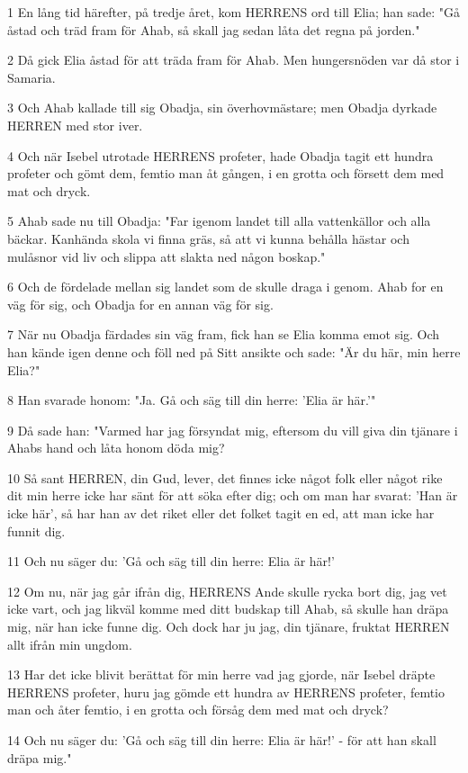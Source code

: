 \par 1 En lång tid härefter, på tredje året, kom HERRENS ord till Elia; han sade: "Gå åstad och träd fram för Ahab, så skall jag sedan låta det regna på jorden."
\par 2 Då gick Elia åstad för att träda fram för Ahab. Men hungersnöden var då stor i Samaria.
\par 3 Och Ahab kallade till sig Obadja, sin överhovmästare; men Obadja dyrkade HERREN med stor iver.
\par 4 Och när Isebel utrotade HERRENS profeter, hade Obadja tagit ett hundra profeter och gömt dem, femtio man åt gången, i en grotta och försett dem med mat och dryck.
\par 5 Ahab sade nu till Obadja: "Far igenom landet till alla vattenkällor och alla bäckar. Kanhända skola vi finna gräs, så att vi kunna behålla hästar och mulåsnor vid liv och slippa att slakta ned någon boskap."
\par 6 Och de fördelade mellan sig landet som de skulle draga i genom. Ahab for en väg för sig, och Obadja for en annan väg för sig.
\par 7 När nu Obadja färdades sin väg fram, fick han se Elia komma emot sig. Och han kände igen denne och föll ned på Sitt ansikte och sade: "Är du här, min herre Elia?"
\par 8 Han svarade honom: "Ja. Gå och säg till din herre: 'Elia är här.'"
\par 9 Då sade han: "Varmed har jag försyndat mig, eftersom du vill giva din tjänare i Ahabs hand och låta honom döda mig?
\par 10 Så sant HERREN, din Gud, lever, det finnes icke något folk eller något rike dit min herre icke har sänt för att söka efter dig; och om man har svarat: 'Han är icke här', så har han av det riket eller det folket tagit en ed, att man icke har funnit dig.
\par 11 Och nu säger du: 'Gå och säg till din herre: Elia är här!'
\par 12 Om nu, när jag går ifrån dig, HERRENS Ande skulle rycka bort dig, jag vet icke vart, och jag likväl komme med ditt budskap till Ahab, så skulle han dräpa mig, när han icke funne dig. Och dock har ju jag, din tjänare, fruktat HERREN allt ifrån min ungdom.
\par 13 Har det icke blivit berättat för min herre vad jag gjorde, när Isebel dräpte HERRENS profeter, huru jag gömde ett hundra av HERRENS profeter, femtio man och åter femtio, i en grotta och försåg dem med mat och dryck?
\par 14 Och nu säger du: 'Gå och säg till din herre: Elia är här!' - för att han skall dräpa mig."
